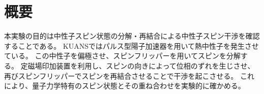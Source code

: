 \section*{概要}
本実験の目的は中性子スピン状態の分解・再結合による中性子スピン干渉を確認することである。
KUANSではパルス型陽子加速器を用いて熱中性子を発生させている。
この中性子を偏極させ、スピンフリッパーを用いてスピンを分解する。
定磁場印加装置を利用し、スピンの向きによって位相のずれを生じさせ、
再びスピンフリッパーでスピンを再結合させることで干渉を起こさせる。
これにより、量子力学特有のスピン状態とその重ね合わせを実験的に確かめる。
